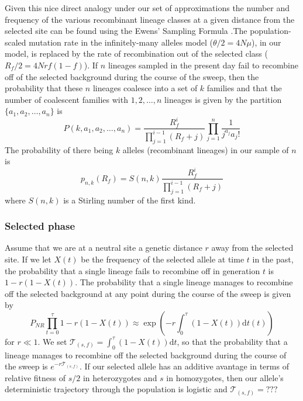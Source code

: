 \documentclass[a4paper,10pt]{article}
\begin{document}
Given this nice direct analogy under our set of approximations the number and frequency of the various recombinant lineage classes at a given distance from the selected site can be found using the Ewens' Sampling Formula \citep[ESF][]{}.The population-scaled mutation rate in the infinitely-many alleles model ($\theta/2=4N\mu$), in our model, is replaced by the rate of recombination out of the selected class ($R_{f}/2=4Nrf(1-f)$). If $n$ lineages sampled in the present day fail to recombine off of the selected background during the course of the sweep, then the  probability that these $n$ lineages coalesce into a set of $k$ families and that the number of coalescent families with $1,2,\dots,n$ lineages is given by the partition
 $\{a_1,a_2,\dots,a_n\}$ is 
\begin{equation}
P\left(k,a_1,a_2,\dots,a_n\right) =\frac{R_f^i}{ \prod_{j=1}^{i-1} (R_f +j) } \prod_{j=1}^n\frac{1}{j^{a_j}a_j!} \label{ESF}
\end{equation}
The probability of there being $k$ alleles (recombinant lineages) in our sample of $n$ is 
\begin{equation}
p_{n,k}(R_f)  = S(n,k) \frac{R_f^i}{ \prod_{j=1}^{i-1} (R_f +j) }  \label{ESF2}
\end{equation}
where $S(n,k)$ is a Stirling number of the first kind.  

\subsubsection{Selected phase}
Assume that we are at a neutral site a genetic distance $r$ away from the selected site. 
If we let $X\left(t\right)$ be the frequency of the selected allele at time $t$ in the past, the probability that a single lineage fails to recombine off in generation $t$ is $1-r\left(1-X(t)\right)$. The probability that a single lineage manages to recombine off the selected background at any point during the course of the sweep is given by 
\begin{equation}
P_{NR} \prod_{t=0}^{\tau} 1-r\left(1-X(t)\right)  \approx \exp \left(-r \int_0^{\tau}(1-X\left(t\right))\mathrm{d} t\left(t\right) \right)
\end{equation}
for $r \ll 1$. We set  $\mathcal{T}_{\left(s,f\right)} = \int_0^{\tau}(1-X\left(t\right))\mathrm{d}t$, so that the probability that a lineage manages to recombine off the selected background during the course of the sweep is $e^{-r\mathcal{T}_{\left(s,f\right)}}$. If our selected allele has an additive avantage in terms of relative fitness of $s/2$ in heterozygotes and $s$ in homozygotes, then our allele's deterministic trajectory through the population is logistic and $\mathcal{T}_{\left(s,f\right)} =???$
\end{document}
